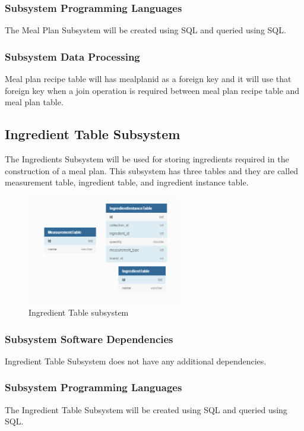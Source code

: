 \subsubsection{Subsystem Programming Languages}
The Meal Plan Subsystem will be created using SQL and queried using SQL.

\subsubsection{Subsystem Data Processing}
Meal plan recipe table will has mealplanid as a foreign key and it will use that foreign key when a join operation is required between meal plan recipe table and meal plan table.

\subsection{Ingredient Table Subsystem}
The Ingredients Subsystem will be used for storing ingredients required in the construction of a meal plan. This subsystem has three tables and they are called measurement table, ingredient table, and ingredient instance table.

\begin{figure}[h!]
	\centering
 	\includegraphics[width=0.60\textwidth]{images/Ingredient_SubSystempng.png}
 \caption{Ingredient Table subsystem}
\end{figure}

\subsubsection{Subsystem Software Dependencies}
Ingredient Table Subsystem does not have any additional dependencies.

\subsubsection{Subsystem Programming Languages}
The Ingredient Table Subsystem will be created using SQL and queried using SQL.


